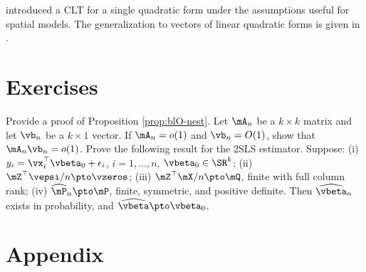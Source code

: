 \documentclass[english,12pt]{book}\usepackage[]{graphicx}\usepackage[]{xcolor}
\begin{document}
\cite{kelejian2001asymptotic} introduced a CLT for a single quadratic form under the assumptions useful for spatial models. The generalization to vectors of linear quadratic forms is given in \cite{kelejian2010specification}.


\section{Exercises}

\begin{exercises}
    \exercise Provide a proof of Proposition \ref{prop:blO-nest}.
    \exercise Let $\mA_n$ be a $k\times k$ matrix and let $\vb_n$ be a $k\times 1$ vector. If $\mA_n = o(1)$ and $\vb_n = O(1)$, show that $\mA_n\vb_n= o(1)$.
    \exercise Prove the following result for the 2SLS estimator. Suppose: (i) $y_i = \vx_i^\top\vbeta_0 + \epsilon_i$, $i= 1, ..., n$, $\vbeta_0\in \SR^k$; (ii) $\mZ^\top\vepsi/n\pto \vzeros$; (iii) $\mZ^\top\mX/n\pto \mQ$, finite with full column rank; (iv) $\widehat{\mP}_n\pto \mP$, finite, symmetric, and positive definite. Then $\widehat{\vbeta}_n$ exists in probability, and  $\widehat{\vbeta}\pto \vbeta_0$.
\end{exercises}   



\section*{Appendix}
\end{document}
